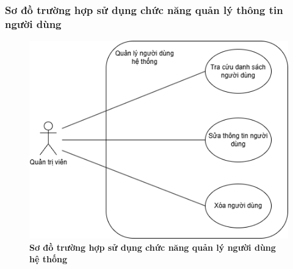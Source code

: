 \subsubsection{Sơ đồ trường hợp sử dụng chức năng quản lý thông tin người dùng}

\begin{figure}[H]
	\centering
	\includegraphics[width=12cm]{Images/use_case/use_case_user.png}
	\caption[Sơ đồ trường hợp sử dụng chức năng quản lý người dùng]{\bfseries \fontsize{12pt}{0pt}
		\selectfont Sơ đồ trường hợp sử dụng chức năng quản lý người dùng hệ thống}
	\label{use_case_user} %
\end{figure}

